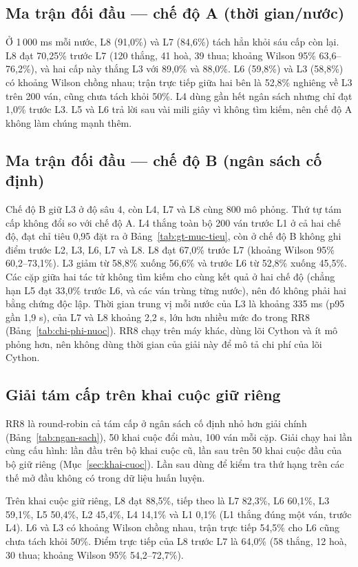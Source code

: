 \subsection{Ma trận đối đầu --- chế độ A (thời gian/nước)}


Ở 1\,000 ms mỗi nước, L8 (91{,}0\%) và L7 (84{,}6\%) tách hẳn khỏi sáu cấp còn lại. L8 đạt 70{,}25\% trước L7 (120 thắng, 41 hoà, 39 thua; khoảng Wilson 95\% 63{,}6--76{,}2\%), và hai cấp này thắng L3 với 89{,}0\% và 88{,}0\%. L6 (59{,}8\%) và L3 (58{,}8\%) có khoảng Wilson chồng nhau; trận trực tiếp giữa hai bên là 52{,}8\% nghiêng về L3 trên 200 ván, cũng chưa tách khỏi 50\%. L4 dùng gần hết ngân sách nhưng chỉ đạt 1{,}0\% trước L3. L5 và L6 trả lời sau vài mili giây vì không tìm kiếm, nên chế độ A không làm chúng mạnh thêm.

\subsection{Ma trận đối đầu --- chế độ B (ngân sách cố định)}


Chế độ B giữ L3 ở độ sâu 4, còn L4, L7 và L8 cùng 800 mô phỏng. Thứ tự tám cấp không đổi so với chế độ A. L4 thắng toàn bộ 200 ván trước L1 ở cả hai chế độ, đạt chỉ tiêu 0{,}95 đặt ra ở Bảng~\ref{tab:gt-muc-tieu}, còn ở chế độ B không ghi điểm trước L2, L3, L6, L7 và L8. L8 đạt 67{,}0\% trước L7 (khoảng Wilson 95\% 60{,}2--73{,}1\%). L3 giảm từ 58{,}8\% xuống 56{,}6\% và trước L6 từ 52{,}8\% xuống 45{,}5\%. Các cặp giữa hai tác tử không tìm kiếm cho cùng kết quả ở hai chế độ (chẳng hạn L5 đạt 33{,}0\% trước L6, và các ván trùng từng nước), nên đó không phải hai bằng chứng độc lập. Thời gian trung vị mỗi nước của L3 là khoảng 335 ms (p95 gần 1{,}9 s), của L7 và L8 khoảng 2{,}2 s, lớn hơn nhiều mức đo trong RR8 (Bảng~\ref{tab:chi-phi-nuoc}). RR8 chạy trên máy khác, dùng lõi Cython và ít mô phỏng hơn, nên không dùng thời gian của giải này để mô tả chi phí của lõi Cython.

\subsection{Giải tám cấp trên khai cuộc giữ riêng}
\label{sec:rr8-giu-rieng}
RR8 là round-robin cả tám cấp ở ngân sách cố định nhỏ hơn giải chính (Bảng~\ref{tab:ngan-sach}), 50 khai cuộc đổi màu, 100 ván mỗi cặp. Giải chạy hai lần cùng cấu hình: lần đầu trên bộ khai cuộc cũ, lần sau trên 50 khai cuộc đầu của bộ giữ riêng (Mục~\ref{sec:khai-cuoc}). Lần sau dùng để kiểm tra thứ hạng trên các thế mở đầu không có trong dữ liệu huấn luyện.



Trên khai cuộc giữ riêng, L8 đạt 88{,}5\%, tiếp theo là L7 82{,}3\%, L6 60{,}1\%, L3 59{,}1\%, L5 50{,}4\%, L2 45{,}4\%, L4 14{,}1\% và L1 0{,}1\% (L1 thắng đúng một ván, trước L4). L6 và L3 có khoảng Wilson chồng nhau, trận trực tiếp 54{,}5\% cho L6 cũng chưa tách khỏi 50\%. Điểm trực tiếp của L8 trước L7 là 64{,}0\% (58 thắng, 12 hoà, 30 thua; khoảng Wilson 95\% 54{,}2--72{,}7\%).

